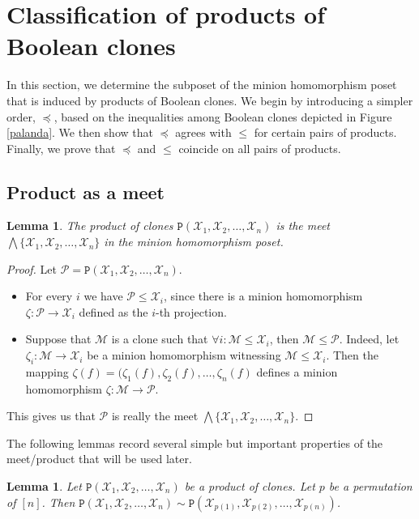 \documentclass{amsart}
\numberwithin{equation}{section}
\theoremstyle{plain}
\newtheorem{lemma}[theorem]{Lemma}
\theoremstyle{definition}
\def\clone#1{\mathcal{#1}}
\def\C#1{{\mathtt{P}}(#1)}
\begin{document}
\section{Classification of products of Boolean clones}

In this section, we determine the subposet of the minion homomorphism poset that is
induced by products of Boolean clones. 
We begin by introducing a simpler order, $\preceq$, based on the inequalities among Boolean clones depicted in Figure \ref{palanda}. We then show that $\preceq$ agrees with $\leq$ for certain pairs of products. Finally, we prove that $\preceq$ and $\leq$ coincide on all pairs of products.

\subsection{Product as a meet}

\begin{lemma}
The product of clones $\C{\clone{X}_1,\clone{X}_2,\dots, \clone{X}_n}$ is the meet $\bigwedge \{\clone{X}_1,\clone{X}_2,\dots,\clone{X}_n\}$ in the minion homomorphism poset. 
\end{lemma}
\begin{proof}
Let $\clone{P} = \C{\clone{X}_1,\clone{X}_2,\dots, \clone{X}_n}$.

\begin{itemize}
\item For every $i$ we have $\clone{P}\leq \clone{X}_i$, since there is a minion homomorphism $\zeta: \clone{P}\to \clone{X}_i$ defined as the $i$-th projection.
\item Suppose that $\clone{M}$ is a clone such that $\forall i:\clone{M} \leq \clone{X}_i$, then $\clone{M}\leq \clone{P}$. Indeed, let $\zeta_i:\clone{M}\to\clone{X}_i$ be a minion homomorphism witnessing $\clone{M}\leq \clone{X}_i$. Then the mapping $\zeta(f) = (\zeta_1(f), \zeta_2(f), \dots, \zeta_n(f)$ defines a minion homomorphism $\zeta:\clone{M}\to\clone{P}$.
\end{itemize}
This gives us that $\clone{P}$ is really the meet $\bigwedge \{\clone{X}_1,\clone{X}_2,\dots,\clone{X}_n\}$.
\end{proof}

The following lemmas record several simple but important properties of the meet/product that will be used later.

\begin{lemma}
\label{perm}
  Let $\C{\clone{X}_1,\clone{X}_2,\dots, \clone{X}_n}$ be a product of clones. Let $p$ be a permutation of $[n]$. Then $\C{\clone{X}_1,\clone{X}_2,\dots, \clone{X}_n}\sim\C{\clone{X}_{p(1)},\clone{X}_{p(2)},\dots,\clone{X}_{p(n)}}$.
\end{lemma}
\end{document}
